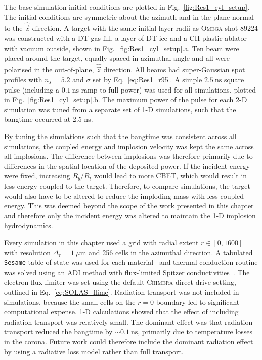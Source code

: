 The base simulation initial conditions are plotted in Fig.~\ref{fig:Res1_cyl_setup}.
The initial conditions are symmetric about the azimuth and in the plane normal to the $\hat{\vec{z}}$ direction.
A target with the same initial layer radii as \textsc{Omega} shot 89224 was constructed with a DT gas fill, a layer of DT ice and a CH plastic ablator with vacuum outside, shown in Fig.~\ref{fig:Res1_cyl_setup}.a.
Ten beam were placed around the target, equally spaced in azimuthal angle and all were polarised in the out-of-plane, $\hat{\vec{z}}$ direction.
All beams had super-Gaussian spot profiles with $n_s=5.2$ and $\sigma$ set by Eq.~\ref{eq:Res1_r95}.
A simple $2.5\ \text{ns}$ square pulse (including a $0.1\ \text{ns}$ ramp to full power) was used for all simulations, plotted in Fig.~\ref{fig:Res1_cyl_setup}.b.
The maximum power of the pulse for each 2-D simulation was tuned from a separate set of 1-D simulations, such that the bangtime occurred at 2.5 ns.

By tuning the simulations such that the bangtime was consistent across all simulations, the coupled energy and implosion velocity was kept the same across all implosions.
The difference between implosions was therefore primarily due to differences in the spatial location of the deposited power.
If the incident energy were fixed, increasing $R_b/R_t$ would lead to more \ac{CBET}, which would result in less energy coupled to the target.
Therefore, to compare simulations, the target would also have to be altered to reduce the imploding mass with less coupled energy.
This was deemed beyond the scope of the work presented in this chapter and therefore only the incident energy was altered to maintain the 1-D implosion hydrodynamics.

Every simulation in this chapter used a grid with radial extent $r\in[0,1600]$ with resolution $\Delta_r=1\ \mu\text{m}$ and 256 cells in the azimuthal direction.
A tabulated \texttt{Sesame} table of state was used for each material~\cite{mchardy_introduction_2018} and thermal conduction routine was solved using an \ac{ADI} method with flux-limited Spitzer conductivities~\cite{peaceman_numerical_1955}.
The electron flux limiter was set using the default \textsc{Chimera} direct-drive setting, outlined in Eq.~\ref{eq:SOLAS_flime}.
Radiation transport was not included in simulations, because the small cells on the $r=0$ boundary led to significant computational expense.
1-D calculations showed that the effect of including radiation transport was relatively small.
The dominant effect was that radiation transport reduced the bangtime by $\sim 0.1\ \text{ns}$, primarily due to temperature losses in the corona.
Future work could therefore include the dominant radiation effect by using a radiative loss model rather than full transport.

